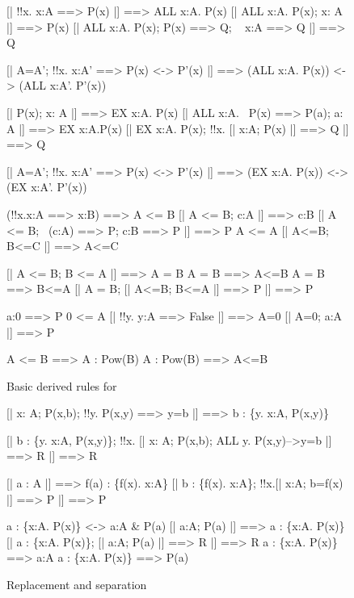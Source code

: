 \begin{figure}
\begin{ttbox}
       [| !!x. x:A ==> P(x) |] ==> ALL x:A. P(x)
       [| ALL x:A. P(x);  x: A |] ==> P(x)
       [| ALL x:A. P(x);  P(x) ==> Q;  ~ x:A ==> Q |] ==> Q

   [| A=A';  !!x. x:A' ==> P(x) <-> P'(x) |] ==> 
            (ALL x:A. P(x)) <-> (ALL x:A'. P'(x))

        [| P(x);  x: A |] ==> EX x:A. P(x)
       [| ALL x:A. ~P(x) ==> P(a);  a: A |] ==> EX x:A.P(x)
        [| EX x:A. P(x);  !!x. [| x:A; P(x) |] ==> Q |] ==> Q

    [| A=A';  !!x. x:A' ==> P(x) <-> P'(x) |] ==> 
            (EX x:A. P(x)) <-> (EX x:A'. P'(x))

       (!!x.x:A ==> x:B) ==> A <= B
       [| A <= B;  c:A |] ==> c:B
      [| A <= B;  ~(c:A) ==> P;  c:B ==> P |] ==> P
   A <= A
  [| A<=B;  B<=C |] ==> A<=C

     [| A <= B;  B <= A |] ==> A = B
    A = B ==> A<=B
    A = B ==> B<=A
     [| A = B;  [| A<=B; B<=A |] ==> P |]  ==>  P

          a:0 ==> P
   0 <= A
        [| !!y. y:A ==> False |] ==> A=0
        [| A=0;  a:A |] ==> P

            A <= B ==> A : Pow(B)
            A : Pow(B)  ==>  A<=B
\end{ttbox}
\caption{Basic derived rules for {\ZF}} \label{ZF-lemmas1}
\end{figure}



\begin{figure}
\begin{ttbox}
      [| x: A;  P(x,b);  !!y. P(x,y) ==> y=b |] ==> 
              b : \{y. x:A, P(x,y)\}

      [| b : \{y. x:A, P(x,y)\};  
                 !!x. [| x: A;  P(x,b);  ALL y. P(x,y)-->y=b |] ==> R 
              |] ==> R

       [| a : A |] ==> f(a) : \{f(x). x:A\}
       [| b : \{f(x). x:A\};  
                 !!x.[| x:A;  b=f(x) |] ==> P |] ==> P

     a : \{x:A. P(x)\} <-> a:A & P(a)
       [| a:A;  P(a) |] ==> a : \{x:A. P(x)\}
       [| a : \{x:A. P(x)\};  [| a:A; P(a) |] ==> R |] ==> R
      a : \{x:A. P(x)\} ==> a:A
      a : \{x:A. P(x)\} ==> P(a)
\end{ttbox}
\caption{Replacement and separation} \label{ZF-lemmas2}
\end{figure}


